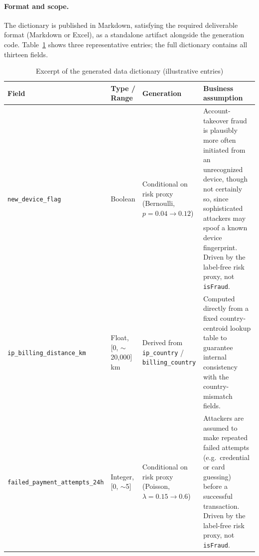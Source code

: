 \paragraph{Format and scope.} The dictionary is published in Markdown, satisfying the required deliverable format (Markdown or Excel), as a standalone artifact alongside the generation code. Table~\ref{tab:data-dict-excerpt} shows three representative entries; the full dictionary contains all thirteen fields.

\begin{table}[htbp]
\centering
\caption{Excerpt of the generated data dictionary (illustrative entries)}
\label{tab:data-dict-excerpt}
\footnotesize
\begin{tabular}{@{}lp{2.2cm}p{2.2cm}p{6cm}@{}}
\toprule
\textbf{Field} & \textbf{Type / Range} & \textbf{Generation} & \textbf{Business assumption} \\
\midrule
\texttt{new\_device\_flag} & Boolean & Conditional on risk proxy (Bernoulli, $p=0.04\!\to\!0.12$) & Account-takeover fraud is plausibly more often initiated from an unrecognized device, though not certainly so, since sophisticated attackers may spoof a known device fingerprint. Driven by the label-free risk proxy, not \texttt{isFraud}. \\
\texttt{ip\_billing\_distance\_km} & Float, [0, $\sim$20{,}000] km & Derived from \texttt{ip\_country} / \texttt{billing\_country} & Computed directly from a fixed country-centroid lookup table to guarantee internal consistency with the country-mismatch fields. \\
\texttt{failed\_payment\_attempts\_24h} & Integer, [0, $\sim$5] & Conditional on risk proxy (Poisson, $\lambda=0.15\!\to\!0.6$) & Attackers are assumed to make repeated failed attempts (e.g.\ credential or card guessing) before a successful transaction. Driven by the label-free risk proxy, not \texttt{isFraud}. \\
\bottomrule
\end{tabular}
\end{table}
